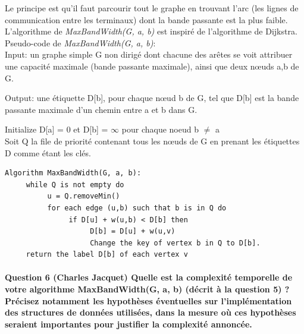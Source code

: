 \documentclass[a4paper]{article}
\begin{document}
Le principe est qu'il faut parcourir tout le graphe en trouvant l'arc (les lignes de communication entre les terminaux) dont la bande passante est la plus faible. L'algorithme de \textit{MaxBandWidth(G, a, b)} est inspiré de l'algorithme de Dijkstra.\\

Pseudo-code de \textit{MaxBandWidth(G, a, b)}:\\
     Input: un graphe simple G non dirigé dont chacune des arêtes se voit attribuer une capacité maximale (bande passante maximale), ainsi que deux nœuds a,b de G.
	 
     Output: une étiquette D[b], pour chaque nœud b de G, tel que D[b] est la bande passante maximale d’un chemin entre a et b dans G.
      
      Initialize D[a] = 0 et D[b] =  $\infty$ pour chaque noeud b $\neq$ a\\
      Soit Q la file de priorité contenant tous les nœuds de G en prenant les étiquettes D comme étant les clés.
\begin{verbatim}
Algorithm MaxBandWidth(G, a, b):
     while Q is not empty do
          u = Q.removeMin()
          for each edge (u,b) such that b is in Q do
               if D[u] + w(u,b) < D[b] then
                    D[b] = D[u] + w(u,v)
                    Change the key of vertex b in Q to D[b].
     return the label D[b] of each vertex v
\end{verbatim}




\paragraph{Question 6 (Charles Jacquet) Quelle est la complexité temporelle de votre algorithme MaxBandWidth(G, a, b) (décrit à la question 5) ? Précisez notamment les hypothèses éventuelles sur l’implémentation des structures de données utilisées, dans la mesure où ces hypothèses seraient importantes pour justifier la complexité annoncée.}
\end{document}
